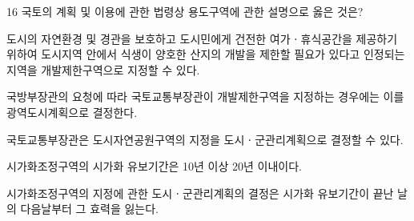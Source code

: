 \begin{question}{16}
국토의 계획 및 이용에 관한 법령상 용도구역에 관한 설명으로 옳은 것은?
\begin{choices}
  \item 도시의 자연환경 및 경관을 보호하고 도시민에게 건전한 여가ㆍ휴식공간을 제공하기 위하여 도시지역 안에서 식생이 양호한 산지의 개발을 제한할 필요가 있다고 인정되는 지역을 개발제한구역으로 지정할 수 있다.
  \item 국방부장관의 요청에 따라 국토교통부장관이 개발제한구역을 지정하는 경우에는 이를 광역도시계획으로 결정한다.
  \item 국토교통부장관은 도시자연공원구역의 지정을 도시ㆍ군관리계획으로 결정할 수 있다.
  \item 시가화조정구역의 시가화 유보기간은 10년 이상 20년 이내이다.
  \item 시가화조정구역의 지정에 관한 도시ㆍ군관리계획의 결정은 시가화 유보기간이 끝난 날의 다음날부터 그 효력을 잃는다.
\end{choices}
\end{question}
